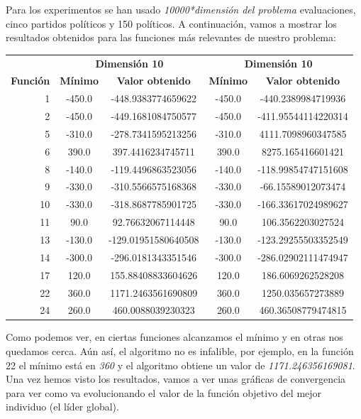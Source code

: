 \documentclass[12pt]{article}
\numberwithin{figure}{section} %
\numberwithin{table}{section} %
\begin{document}
	Para los experimentos se han usado \textit{10000*dimensión del problema} evaluaciones, cinco partidos políticos y 150 políticos. A continuación, vamos a mostrar los resultados obtenidos para las funciones más relevantes de nuestro problema:
	
	\begin{table}[H]
		\centering
		\begin{tabular}{rcccc}
			\textbf{} & \multicolumn{2}{c}{\textbf{Dimensión 10}} & \multicolumn{2}{c}{\textbf{Dimensión 10}} \\ \cline{2-5} 
			\textbf{Función} & \textbf{Mínimo} & \textbf{Valor obtenido} & \textbf{Mínimo} & \textbf{Valor obtenido} \\ \hline
			1 & -450.0 & -448.9383774659622 & -450.0 & -440.2389984719936 \\
			2 & -450.0 & -449.1681084750577 & -450.0 & -411.95544114220314 \\
			5 & -310.0 & -278.7341595213256 & -310.0 & 4111.7098960347585 \\
			6 & 390.0 & 397.4416234745711 & 390.0 & 8275.165416601421 \\
			8 & -140.0 & -119.4496863523056 & -140.0 & -118.99854747151608 \\
			9 & -330.0 & -310.5566575168368 & -330.0 & -66.15589012073474 \\
			10 & -330.0 & -318.8687785901725 & -330.0 & -166.33617024989627 \\
			11 & 90.0 & 92.76632067114448 & 90.0 & 106.3562203027524 \\
			13 & -130.0 & -129.01951580640508 & -130.0 & -123.29255503352549 \\
			14 & -300.0 & -296.0181343351546 & -300.0 & -286.02902111474947 \\
			17 & 120.0 & 155.88408833604626 & 120.0 & 186.6069262528208 \\
			22 & 360.0 & 1171.2463561690809 & 360.0 & 1250.035657273889 \\
			24 & 260.0 & 460.0088039230323 & 260.0 & 460.36508779474815
		\end{tabular}
	\end{table}
	
	Como podemos ver, en ciertas funciones alcanzamos el mínimo y en otras nos quedamos cerca. Aún así, el algoritmo no es infalible, por ejemplo, en la función 22 el mínimo está en \textit{360} y el algoritmo obtiene un valor de \textit{1171.246356169081}.\\
	
	Una vez hemos visto los resultados, vamos a ver unas gráficas de convergencia para ver como va evolucionando el valor de la función objetivo del mejor individuo (el líder global). 
	
\end{document}
